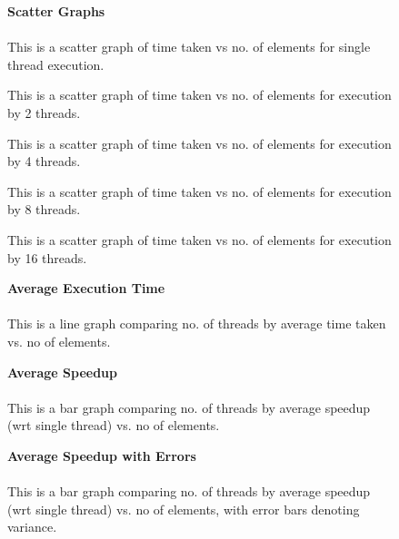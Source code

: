\documentclass{article}
\begin{document}
    \begin{figure}
        \textbf{Scatter Graphs}\\\\
        This is a scatter graph of time taken vs no. of elements for single thread execution.\\
        
    \end{figure}
    \begin{figure}
        This is a scatter graph of time taken vs no. of elements for execution by 2 threads.\\
        
    \end{figure}
    \begin{figure}
        This is a scatter graph of time taken vs no. of elements for execution by 4 threads.\\
        
    \end{figure}
    \begin{figure}
        This is a scatter graph of time taken vs no. of elements for execution by 8 threads.\\
        
    \end{figure}
    \begin{figure}
        This is a scatter graph of time taken vs no. of elements for execution by 16 threads.\\
        
    \end{figure}

    \begin{figure}
        \textbf{Average Execution Time}\\\\
        This is a line graph comparing no. of threads by average time taken vs. no of elements.\\
        
    \end{figure}

    \begin{figure}
        \textbf{Average Speedup}\\\\
        This is a bar graph comparing no. of threads by average speedup (wrt single thread) vs. no of elements.\\
        
    \end{figure}

    \begin{figure}
        \textbf{Average Speedup with Errors}\\\\
        This is a bar graph comparing no. of threads by average speedup (wrt single thread) vs. no of elements, with error bars denoting variance.\\
        
    \end{figure}
\end{document}
